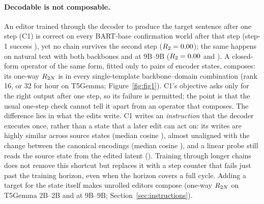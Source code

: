 \paragraph{Decodable is not composable.}
%
An editor trained through the decoder to produce the target sentence after one step (C1) is correct on every BART-base confirmation
world after that step (step-1 success \CLoneVfiveCOneRoneMin), yet no chain survives the second step ($R_{2}=0.00$);
the same happens on natural text with both backbones and at 9B--9B ($R_{2}=0.00$ and \CLeighteenCOneRtwoMax). A
closed-form operator of the same form, fitted only to pairs of encoder states, composes: its one-way $R_{2N}$ is
\CLoneVfiveBaseMin{} in every single-template backbone--domain combination (rank 16, or 32 for hour on T5Gemma;
Figure~\ref{fig:fig1}). C1's objective asks only for the right output after one step, so its failure is permitted; the point is that
the usual one-step check cannot tell it apart from an operator that composes. The difference lies in what the edits write. C1 writes
an \emph{instruction} that the decoder executes once, rather than a state that a later edit can act on: its writes are highly similar
across source states (median cosine \CLtwoWriteCosSource), almost unaligned with the change between the canonical encodings (median
cosine \CLtwoWriteCosCanon), and a linear probe still reads the source state from the edited latent (\CLtwoProbeSource). Training
through longer chains does not remove this shortcut but replaces it with a step counter that fails just past the training horizon, even
when the horizon covers a full cycle. Adding a target for the state itself makes unrolled editors compose (one-way $R_{2N}$
\CLfourTfiveCThreeUfour{} on T5Gemma 2B--2B and \CLeighteenCThreeMin{} at 9B--9B; Section~\ref{sec:instructions}).

